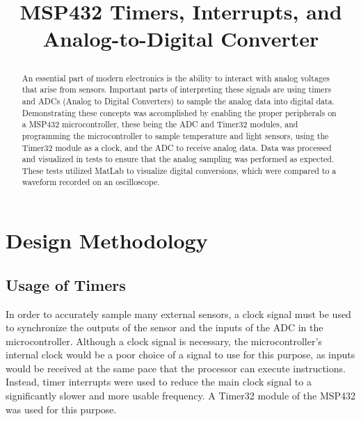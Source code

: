 \documentclass[conference]{IEEEtran}
\begin{document}
\title{MSP432 Timers, Interrupts, and Analog-to-Digital Converter\\

\author{
\and
{}
}
}

\maketitle

\begin{abstract}
An essential part of modern electronics is the ability to interact with
analog voltages that arise from sensors. Important parts of interpreting
these signals are using timers and ADCs (Analog to Digital Converters) to
sample the analog data into digital data. Demonstrating these concepts was
accomplished by enabling the proper peripherals on a MSP432 microcontroller,
these being the ADC and Timer32 modules, and programming the microcontroller
to sample temperature and light sensors, using the Timer32 module
as a clock, and the ADC to receive analog data. Data was processed and
visualized in tests to ensure that the analog sampling was performed as
expected. These tests utilized MatLab to visualize digital conversions,
which were compared to a waveform recorded on an oscilloscope.
\end{abstract}

\section{Design Methodology}

\subsection{Usage of Timers}
In order to accurately sample many external sensors, a clock signal must be 
used to synchronize the outputs of the sensor and the inputs of the ADC in
the microcontroller. Although a clock signal is necessary, the
microcontroller's internal clock would be a poor choice of a signal to use
for this purpose, as inputs would be received at the same pace that the
processor can execute instructions. Instead, timer interrupts were used to
reduce the main clock signal to a significantly slower and more usable
frequency. A Timer32 module of the MSP432 was used for this purpose.
\end{document}
